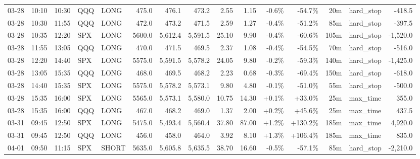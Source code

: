 \documentclass[11pt,a4paper,twoside]{article}
\begin{document}
\begin{landscape}
\begin{center}
\begin{longtable}{>{\color{txtmain}}l l l l l r r r r r r r r >{\color{txtmain}}l r}
03-28 & 10:10 & 10:30 & QQQ & LONG & 475.0 & 476.1 & 473.2 & 2.55 & 1.15 & \textcolor{lossred}{-0.6\%} & \textcolor{lossred}{-54.7\%} & 20m & hard\_stop & \textcolor{lossred}{-418.5} \\
03-28 & 10:30 & 11:55 & QQQ & LONG & 472.0 & 473.2 & 471.5 & 2.59 & 1.27 & \textcolor{lossred}{-0.4\%} & \textcolor{lossred}{-51.2\%} & 85m & hard\_stop & \textcolor{lossred}{-397.5} \\
03-28 & 10:35 & 12:20 & SPX & LONG & 5600.0 & 5,612.4 & 5,591.5 & 25.10 & 9.90 & \textcolor{lossred}{-0.4\%} & \textcolor{lossred}{-60.6\%} & 105m & hard\_stop & \textcolor{lossred}{-1,520.0} \\
03-28 & 11:55 & 13:05 & QQQ & LONG & 470.0 & 471.5 & 469.5 & 2.37 & 1.08 & \textcolor{lossred}{-0.4\%} & \textcolor{lossred}{-54.5\%} & 70m & hard\_stop & \textcolor{lossred}{-516.0} \\
03-28 & 12:20 & 14:40 & SPX & LONG & 5575.0 & 5,591.5 & 5,578.2 & 24.05 & 9.80 & \textcolor{lossred}{-0.2\%} & \textcolor{lossred}{-59.3\%} & 140m & hard\_stop & \textcolor{lossred}{-1,425.0} \\
03-28 & 13:05 & 15:35 & QQQ & LONG & 468.0 & 469.5 & 468.2 & 2.23 & 0.68 & \textcolor{lossred}{-0.3\%} & \textcolor{lossred}{-69.4\%} & 150m & hard\_stop & \textcolor{lossred}{-618.0} \\
03-28 & 14:40 & 15:35 & SPX & LONG & 5575.0 & 5,578.2 & 5,573.1 & 9.80 & 4.80 & \textcolor{lossred}{-0.1\%} & \textcolor{lossred}{-51.0\%} & 55m & hard\_stop & \textcolor{lossred}{-500.0} \\
03-28 & 15:35 & 16:00 & SPX & LONG & 5565.0 & 5,573.1 & 5,580.0 & 10.75 & 14.30 & \textcolor{wingreen}{+0.1\%} & \textcolor{wingreen}{+33.0\%} & 25m & max\_time & \textcolor{wingreen}{355.0} \\
03-28 & 15:35 & 16:00 & QQQ & LONG & 467.0 & 468.2 & 469.0 & 1.37 & 2.00 & \textcolor{wingreen}{+0.2\%} & \textcolor{wingreen}{+45.6\%} & 25m & max\_time & \textcolor{wingreen}{437.5} \\
03-31 & 09:45 & 12:50 & SPX & LONG & 5475.0 & 5,493.4 & 5,560.4 & 37.80 & 87.00 & \textcolor{wingreen}{+1.2\%} & \textcolor{wingreen}{+130.2\%} & 185m & max\_time & \textcolor{wingreen}{4,920.0} \\
03-31 & 09:45 & 12:50 & QQQ & LONG & 456.0 & 458.0 & 464.0 & 3.92 & 8.10 & \textcolor{wingreen}{+1.3\%} & \textcolor{wingreen}{+106.4\%} & 185m & max\_time & \textcolor{wingreen}{835.0} \\
04-01 & 09:50 & 11:15 & SPX & SHORT & 5635.0 & 5,605.8 & 5,635.5 & 38.70 & 16.60 & \textcolor{lossred}{-0.5\%} & \textcolor{lossred}{-57.1\%} & 85m & hard\_stop & \textcolor{lossred}{-2,210.0} \\

\end{longtable}
\end{center}
\end{landscape}
\end{document}

